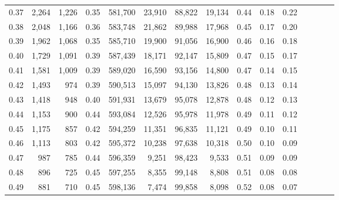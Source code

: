 \begin{tabular}{rrrcrrrrrrrrrrr}
0.37 &   2,264 &  1,226 &                                       0.35 &  581,700 &   23,910 &   88,822 &   19,134 &  0.44 &  0.18 &                         0.22 \\
0.38 &   2,048 &  1,166 &                                       0.36 &  583,748 &   21,862 &   89,988 &   17,968 &  0.45 &  0.17 &                         0.20 \\
0.39 &   1,962 &  1,068 &                                       0.35 &  585,710 &   19,900 &   91,056 &   16,900 &  0.46 &  0.16 &                         0.18 \\
0.40 &   1,729 &  1,091 &                                       0.39 &  587,439 &   18,171 &   92,147 &   15,809 &  0.47 &  0.15 &                         0.17 \\
0.41 &   1,581 &  1,009 &                                       0.39 &  589,020 &   16,590 &   93,156 &   14,800 &  0.47 &  0.14 &                         0.15 \\
0.42 &   1,493 &    974 &                                       0.39 &  590,513 &   15,097 &   94,130 &   13,826 &  0.48 &  0.13 &                         0.14 \\
0.43 &   1,418 &    948 &                                       0.40 &  591,931 &   13,679 &   95,078 &   12,878 &  0.48 &  0.12 &                         0.13 \\
0.44 &   1,153 &    900 &                                       0.44 &  593,084 &   12,526 &   95,978 &   11,978 &  0.49 &  0.11 &                         0.12 \\
0.45 &   1,175 &    857 &                                       0.42 &  594,259 &   11,351 &   96,835 &   11,121 &  0.49 &  0.10 &                         0.11 \\
0.46 &   1,113 &    803 &                                       0.42 &  595,372 &   10,238 &   97,638 &   10,318 &  0.50 &  0.10 &                         0.09 \\
0.47 &     987 &    785 &                                       0.44 &  596,359 &    9,251 &   98,423 &    9,533 &  0.51 &  0.09 &                         0.09 \\
0.48 &     896 &    725 &                                       0.45 &  597,255 &    8,355 &   99,148 &    8,808 &  0.51 &  0.08 &                         0.08 \\
0.49 &     881 &    710 &                                       0.45 &  598,136 &    7,474 &   99,858 &    8,098 &  0.52 &  0.08 &                         0.07 \\

\end{tabular}
